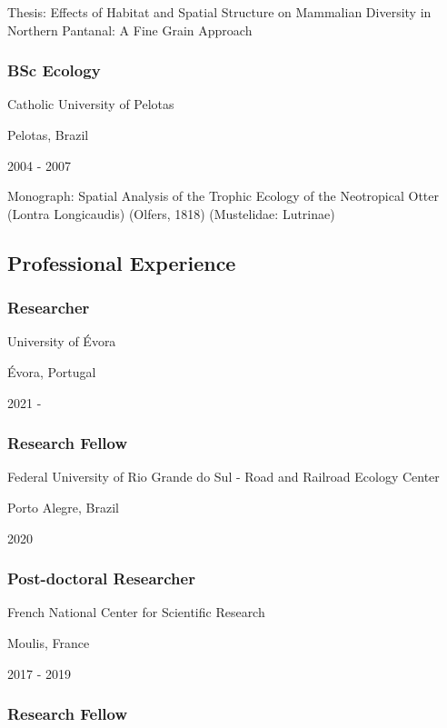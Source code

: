 \documentclass[
]{article}
\begin{document}
Thesis: Effects of Habitat and Spatial Structure on Mammalian Diversity
in Northern Pantanal: A Fine Grain Approach

\hypertarget{bsc-ecology}{%
\subsubsection{BSc Ecology}\label{bsc-ecology}}

Catholic University of Pelotas

Pelotas, Brazil

2004 - 2007

Monograph: Spatial Analysis of the Trophic Ecology of the Neotropical
Otter (Lontra Longicaudis) (Olfers, 1818) (Mustelidae: Lutrinae)

\hypertarget{professional-experience}{%
\subsection{Professional Experience}\label{professional-experience}}

\hypertarget{researcher}{%
\subsubsection{Researcher}\label{researcher}}

University of Évora

Évora, Portugal

2021 -

\hypertarget{research-fellow}{%
\subsubsection{Research Fellow}\label{research-fellow}}

Federal University of Rio Grande do Sul - Road and Railroad Ecology
Center

Porto Alegre, Brazil

2020

\hypertarget{post-doctoral-researcher}{%
\subsubsection{Post-doctoral
Researcher}\label{post-doctoral-researcher}}

French National Center for Scientific Research

Moulis, France

2017 - 2019

\hypertarget{research-fellow-1}{%
\subsubsection{Research Fellow}\label{research-fellow-1}}
\end{document}
